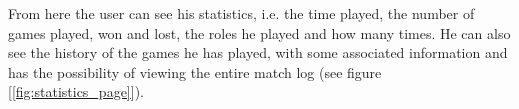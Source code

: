 From here the user can see his statistics, i.e. the time played, the number of games played, won and lost, the roles he played and how many times. He can also see the history of the games he has played, with some associated information and has the possibility of viewing the entire match log (see figure [\ref{fig:statistics_page}]).